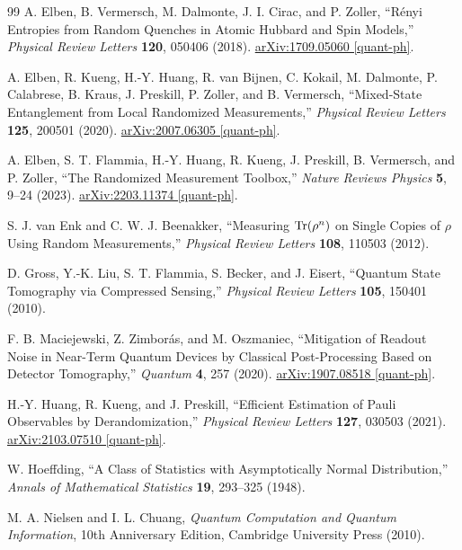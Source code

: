 \documentclass[12pt,a4paper,oneside]{book}
\theoremstyle{plain}
\theoremstyle{definition}
\theoremstyle{remark}
\begin{document}
\begin{thebibliography}{99}
A. Elben, B. Vermersch, M. Dalmonte, J. I. Cirac, and P. Zoller,
``R\'enyi Entropies from Random Quenches in Atomic Hubbard and Spin Models,''
\emph{Physical Review Letters} \textbf{120}, 050406 (2018).
\href{https://arxiv.org/abs/1709.05060}{arXiv:1709.05060 [quant-ph]}.

A. Elben, R. Kueng, H.-Y. Huang, R. van Bijnen, C. Kokail, M. Dalmonte, P. Calabrese, B. Kraus, J. Preskill, P. Zoller, and B. Vermersch,
``Mixed-State Entanglement from Local Randomized Measurements,''
\emph{Physical Review Letters} \textbf{125}, 200501 (2020).
\href{https://arxiv.org/abs/2007.06305}{arXiv:2007.06305 [quant-ph]}.

A. Elben, S. T. Flammia, H.-Y. Huang, R. Kueng, J. Preskill, B. Vermersch, and P. Zoller,
``The Randomized Measurement Toolbox,''
\emph{Nature Reviews Physics} \textbf{5}, 9--24 (2023).
\href{https://arxiv.org/abs/2203.11374}{arXiv:2203.11374 [quant-ph]}.

S. J. van Enk and C. W. J. Beenakker,
``Measuring $\Tr(\rho^n)$ on Single Copies of $\rho$ Using Random Measurements,''
\emph{Physical Review Letters} \textbf{108}, 110503 (2012).

D. Gross, Y.-K. Liu, S. T. Flammia, S. Becker, and J. Eisert,
``Quantum State Tomography via Compressed Sensing,''
\emph{Physical Review Letters} \textbf{105}, 150401 (2010).

F. B. Maciejewski, Z. Zimbor\'as, and M. Oszmaniec,
``Mitigation of Readout Noise in Near-Term Quantum Devices by Classical Post-Processing Based on Detector Tomography,''
\emph{Quantum} \textbf{4}, 257 (2020).
\href{https://arxiv.org/abs/1907.08518}{arXiv:1907.08518 [quant-ph]}.

H.-Y. Huang, R. Kueng, and J. Preskill,
``Efficient Estimation of Pauli Observables by Derandomization,''
\emph{Physical Review Letters} \textbf{127}, 030503 (2021).
\href{https://arxiv.org/abs/2103.07510}{arXiv:2103.07510 [quant-ph]}.

W. Hoeffding,
``A Class of Statistics with Asymptotically Normal Distribution,''
\emph{Annals of Mathematical Statistics} \textbf{19}, 293--325 (1948).

M. A. Nielsen and I. L. Chuang,
\emph{Quantum Computation and Quantum Information},
10th Anniversary Edition, Cambridge University Press (2010).


\end{thebibliography}
\end{document}
